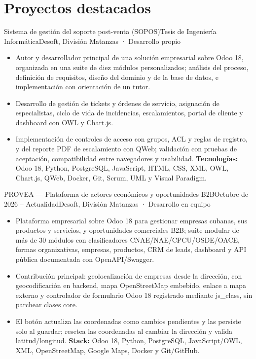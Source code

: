 \section{Proyectos destacados}

\begin{cvproject}{Sistema de gestión del soporte \mbox{post-venta} (SOPOS)}{Tesis de Ingeniería Informática}{Desoft, División Matanzas · Desarrollo propio}
\begin{itemize}
  \item Autor y desarrollador principal de una solución empresarial sobre Odoo 18, organizada en una suite de diez módulos personalizados; análisis del proceso, definición de requisitos, diseño del dominio y de la base de datos, e implementación con orientación de un tutor.
  \item Desarrollo de gestión de tickets y órdenes de servicio, asignación de especialistas, ciclo de vida de incidencias, escalamientos, portal de cliente y dashboard con OWL y Chart.js.
  \item Implementación de controles de acceso con grupos, ACL y reglas de registro, y del reporte PDF de escalamiento con QWeb; validación con pruebas de aceptación, compatibilidad entre navegadores y usabilidad. \textbf{Tecnologías:} Odoo 18, Python, PostgreSQL, JavaScript, HTML, CSS, XML, OWL, Chart.js, QWeb, Docker, Git, Scrum, UML y Visual Paradigm.
\end{itemize}
\end{cvproject}

\begin{cvproject}{PROVEA — Plataforma de actores económicos y oportunidades B2B}{Octubre de 2026 – Actualidad}{Desoft, División Matanzas · Desarrollo en equipo}
\begin{itemize}
  \item Plataforma empresarial sobre Odoo 18 para gestionar empresas cubanas, sus productos y servicios, y oportunidades comerciales B2B; suite modular de más de 30 módulos con clasificadores \mbox{CNAE/NAE/CPCU/OSDE/OACE}, formas organizativas, empresas, productos, CRM de leads, dashboard y API pública documentada con \mbox{OpenAPI/Swagger}.
  \item Contribución principal: geolocalización de empresas desde la dirección, con geocodificación en backend, mapa \mbox{OpenStreetMap} embebido, enlace a mapa externo y controlador de formulario Odoo 18 registrado mediante \mbox{js\_class}, sin parchear clases core.
  \item El botón actualiza las coordenadas como cambios pendientes y las persiste solo al guardar; resetea las coordenadas al cambiar la dirección y valida latitud/longitud. \textbf{Stack:} Odoo 18, Python, PostgreSQL, JavaScript/OWL, XML, \mbox{OpenStreetMap}, Google Maps, Docker y \mbox{Git/GitHub}.
\end{itemize}
\end{cvproject}

